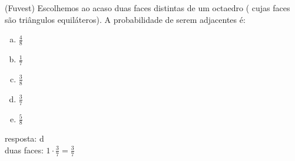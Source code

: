 \begin{ex}
 (Fuvest) Escolhemos ao acaso duas faces distintas de um octaedro ( cujas faces são triângulos equiláteros). A probabilidade de serem adjacentes é:
    \begin{enumerate}[(a)]
    \item $\frac{4}{8}$
    \item $\frac{1}{7}$
    \item $\frac{3}{8}$
    \item $\frac{3}{7}$
    \item $\frac{5}{8}$
    \end{enumerate}
      \begin{sol}
      resposta: d \\
        duas faces: $1 \cdot \frac{3}{7}=\frac{3}{7}$
      \end{sol}
\end{ex}